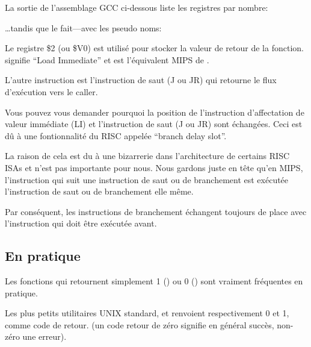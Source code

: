 \label{MIPS_leaf_function_ex1}

La sortie de l'assemblage GCC ci-dessous liste les registres par nombre:



\dots tandis que \IDA le fait---avec les pseudo noms:



Le registre \$2 (ou \$V0) est utilisé pour stocker la valeur de retour de la fonction.
 signifie ``Load Immediate'' et est l'équivalent MIPS de \MOV.


L'autre instruction est l'instruction de saut (J ou JR) qui retourne le flux d'exécution vers le \gls{caller}.


Vous pouvez vous demander pourquoi la position de l'instruction d'affectation de valeur immédiate (LI) et l'instruction de saut (J ou JR) sont échangées. Ceci est dû à une fontionnalité du \ac{RISC} appelée ``branch delay slot''.

La raison de cela est du à une bizarrerie dans l'architecture de certains RISC \ac{ISA}s et n'est pas importante pour nous. Nous gardons juste en tête qu'en MIPS, l'instruction qui suit une instruction de saut ou de branchement est exécutée  l'instruction de saut ou de branchement elle même.

Par conséquent, les instructions de branchement échangent toujours de place avec l'instruction qui doit être exécutée avant.


\subsection{En pratique}

Les fonctions qui retournent simplement 1 () ou 0 () sont vraiment fréquentes en pratique.

Les plus petits utilitaires UNIX standard,  et  renvoient
respectivement 0 et 1, comme code de retour.
(un code retour de zéro signifie en général succès, non-zéro une erreur).


